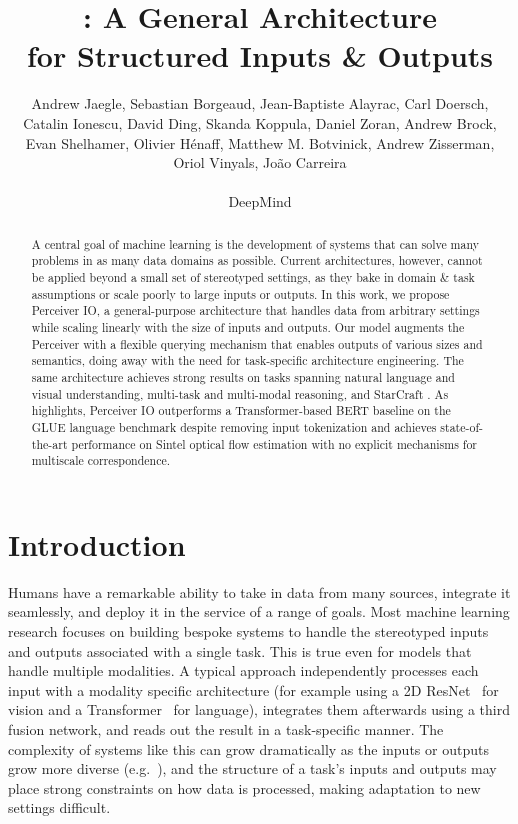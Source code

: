 \documentclass{article} \usepackage{iclr2022_conference,times}
\title{\ourmodel: A General Architecture \\for Structured Inputs \& Outputs}
\author{Andrew Jaegle, 
  Sebastian Borgeaud, 
  Jean-Baptiste Alayrac, 
  Carl Doersch,
  Catalin Ionescu,
  \AND
  David Ding, 
  Skanda Koppula,
  Daniel Zoran,
  Andrew Brock, 
  Evan Shelhamer, 
  Olivier H\'{e}naff, 
  \AND
  Matthew M. Botvinick, 
  Andrew Zisserman, 
  Oriol Vinyals, 
  Jo\~{a}o Carreira \\ \\
  DeepMind\\
}
\newcommand{\ourmodel}{Perceiver IO\xspace}
\begin{document}
\maketitle

\begin{abstract}
A central goal of machine learning is the development of systems that can solve many problems in as many data domains as possible. Current architectures, however, cannot be applied beyond a small set of stereotyped settings, as they bake in domain \& task assumptions or scale poorly to large inputs or outputs. In this work, we propose \ourmodel{}, a general-purpose architecture that handles data from arbitrary settings while scaling linearly with the size of inputs and outputs. Our model augments the Perceiver with a flexible querying mechanism that enables outputs of various sizes and semantics, doing away with the need for task-specific architecture engineering.
The same architecture achieves strong results on tasks spanning natural language and visual understanding, multi-task and multi-modal reasoning, and StarCraft . As highlights, \ourmodel{} outperforms a Transformer-based BERT baseline on the GLUE language benchmark despite removing input tokenization and achieves state-of-the-art performance on Sintel optical flow estimation with no explicit mechanisms for multiscale correspondence.
\end{abstract}


\section{Introduction}

Humans have a remarkable ability to take in data from many sources, integrate it seamlessly, and deploy it in the service of a range of goals. Most machine learning research focuses on building bespoke systems to handle the stereotyped inputs and outputs associated with a single task. This is true even for models that handle multiple modalities. A typical approach independently processes each input with a modality specific architecture (for example using a 2D ResNet~\citep{he2016deep} for vision and a Transformer~\citep{vaswani2017attention} for language), integrates them afterwards using a third fusion network, and reads out the result in a task-specific manner. The complexity of systems like this can grow dramatically as the inputs or outputs grow more diverse (e.g.~\citealt{abramson2020imitating,vinyals2019grandmaster,ramesh2021zero}), and the structure of a task's inputs and outputs may place strong constraints on how data is processed, making adaptation to new settings difficult.
\end{document}
